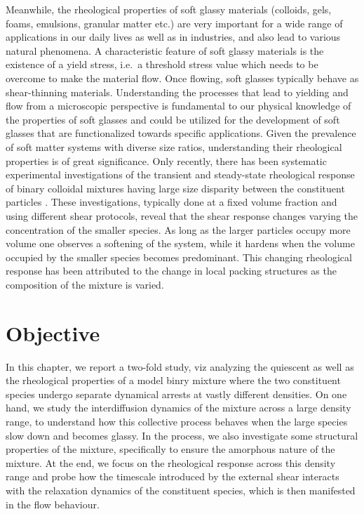 Meanwhile, the rheological properties of soft glassy materials (colloids, gels, foams, emulsions, granular matter etc.) \cite{larson, yodhreview, ludovicRMP2017, joshi2018yield, coussot2014yield, nicolas2018deformation, rodney2011modeling} are very important for a wide range of applications in our daily lives as well as in industries, and also lead to various natural phenomena. A characteristic feature of soft glassy materials is the existence of a yield stress, i.e.~a threshold stress value which needs to be overcome to make the material flow. Once flowing, soft glasses typically behave as shear-thinning materials. Understanding the processes that lead to yielding and flow from a microscopic perspective is fundamental to our physical knowledge of the properties of soft glasses and could be utilized for the development of soft glasses that are functionalized towards specific applications. Given the prevalence of soft matter systems with diverse size ratios, understanding their rheological properties is of great significance. Only recently, there has been systematic experimental investigations of the transient and steady-state rheological response of binary colloidal mixtures having large size disparity between the constituent particles \cite{sentjabrskaja13,egelhaaf13, sentjabrskaja14, sentjabrskaja18, sentjabrskaja19}.  These investigations, typically done at a fixed volume fraction and using different shear protocols, reveal that the shear response changes varying the concentration of the smaller species.  As long as the larger particles occupy more volume one observes a softening of the system, while it hardens when the volume occupied by the smaller species becomes predominant. This changing rheological response has been attributed to the change in local packing structures as the composition of the mixture is varied.


\section{Objective}

In this chapter, we report a two-fold study, viz analyzing the quiescent as well as the rheological properties of a model binry mixture where the two constituent species undergo separate dynamical arrests at vastly different densities. On one hand, we study the interdiffusion dynamics of the mixture across a large density range, to understand how this collective process behaves when the large species slow down and becomes glassy. In the process, we also investigate some structural properties of the mixture, specifically to ensure the amorphous nature of the mixture. At the end, we focus on the rheological response across this density range and probe how the timescale introduced by the external shear interacts with the relaxation dynamics of the constituent species, which is then manifested in the flow behaviour.

